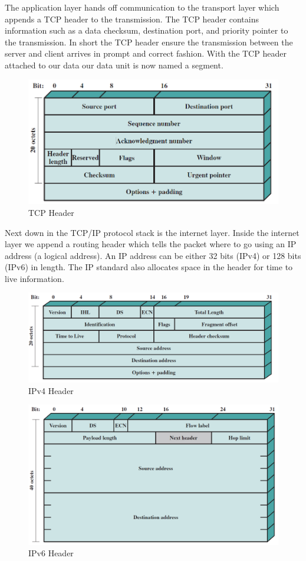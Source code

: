 \documentclass[12pt]{article}
\begin{document}
The application layer hands off communication to the transport layer which 
appends a TCP header to the transmission. The TCP header contains 
information such as a data checksum, destination port, and priority 
pointer to the transmission. In short the TCP header ensure the 
transmission between the server and client arrives in prompt and correct 
fashion. With the TCP header attached to our data our data unit is now 
named a segment.

\begin{figure}[H]
    \centering
    \includegraphics[width=4.5in]{tcp_header.png}
    \caption{TCP Header \cite{Stallings}}
\end{figure}

Next down in the TCP/IP protocol stack is the internet layer. Inside the 
internet layer we append a routing header which tells the packet where to 
go using an IP address (a logical address). An IP address can be either 32 
bits (IPv4) or 128 bits (IPv6) in length. The IP standard also allocates 
space in the header for time to live information. 

\begin{figure}[H]
    \centering
    \includegraphics[width=4.5in]{ipv4_header.png}
    \caption{IPv4 Header \cite{Stallings}}
\end{figure}
\begin{figure}[H]
    \centering
    \includegraphics[width=4.5in]{ipv6_header.png}
    \caption{IPv6 Header \cite{Stallings}}
\end{figure}
\end{document}
